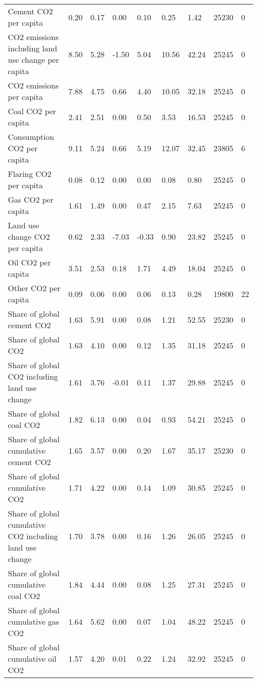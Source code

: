 \begin{longtable}{lllllllll}
\addlinespace
Cement CO2 per capita & 0.20 & 0.17 & 0.00 & 0.10 & 0.25 & 1.42 & 25230 & 0\\
CO2 emissions including land use change per capita & 8.50 & 5.28 & -1.50 & 5.04 & 10.56 & 42.24 & 25245 & 0\\
CO2 emissions per capita & 7.88 & 4.75 & 0.66 & 4.40 & 10.05 & 32.18 & 25245 & 0\\
Coal CO2 per capita & 2.41 & 2.51 & 0.00 & 0.50 & 3.53 & 16.53 & 25245 & 0\\
Consumption CO2 per capita & 9.11 & 5.24 & 0.66 & 5.19 & 12.07 & 32.45 & 23805 & 6\\
\addlinespace
Flaring CO2 per capita & 0.08 & 0.12 & 0.00 & 0.00 & 0.08 & 0.80 & 25245 & 0\\
Gas CO2 per capita & 1.61 & 1.49 & 0.00 & 0.47 & 2.15 & 7.63 & 25245 & 0\\
Land use change CO2 per capita & 0.62 & 2.33 & -7.03 & -0.33 & 0.90 & 23.82 & 25245 & 0\\
Oil CO2 per capita & 3.51 & 2.53 & 0.18 & 1.71 & 4.49 & 18.04 & 25245 & 0\\
Other CO2 per capita & 0.09 & 0.06 & 0.00 & 0.06 & 0.13 & 0.28 & 19800 & 22\\
\addlinespace
Share of global cement CO2 & 1.63 & 5.91 & 0.00 & 0.08 & 1.21 & 52.55 & 25230 & 0\\
Share of global CO2 & 1.63 & 4.10 & 0.00 & 0.12 & 1.35 & 31.18 & 25245 & 0\\
Share of global CO2 including land use change & 1.61 & 3.76 & -0.01 & 0.11 & 1.37 & 29.88 & 25245 & 0\\
Share of global coal CO2 & 1.82 & 6.13 & 0.00 & 0.04 & 0.93 & 54.21 & 25245 & 0\\
Share of global cumulative cement CO2 & 1.65 & 3.57 & 0.00 & 0.20 & 1.67 & 35.17 & 25230 & 0\\
\addlinespace
Share of global cumulative CO2 & 1.71 & 4.22 & 0.00 & 0.14 & 1.09 & 30.85 & 25245 & 0\\
Share of global cumulative CO2 including land use change & 1.70 & 3.78 & 0.00 & 0.16 & 1.26 & 26.05 & 25245 & 0\\
Share of global cumulative coal CO2 & 1.84 & 4.44 & 0.00 & 0.08 & 1.25 & 27.31 & 25245 & 0\\
Share of global cumulative gas CO2 & 1.64 & 5.62 & 0.00 & 0.07 & 1.04 & 48.22 & 25245 & 0\\
Share of global cumulative oil CO2 & 1.57 & 4.20 & 0.01 & 0.22 & 1.24 & 32.92 & 25245 & 0\\

\end{longtable}
